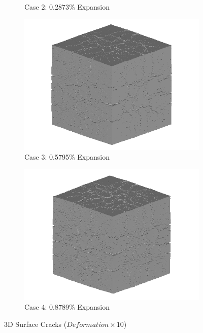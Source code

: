 \begin{figure}[!h]
\begin{subfigure}{.5\textwidth}
    \caption{Case 2: 0.2873\% Expansion}
    \end{subfigure}%
    \begin{subfigure}{.5\textwidth}
      \centering
      \includegraphics[width=.8\linewidth]{Files/exp_3D/DEF/A30X0C_3_3d.png}
    \caption{Case 3: 0.5795\% Expansion}
    \end{subfigure}
    \begin{subfigure}{.5\textwidth}
      \centering
      \includegraphics[width=.8\linewidth]{Files/exp_3D/DEF/A30X0C_4_3d.png}
    \caption{Case 4: 0.8789\% Expansion}
    \end{subfigure}%

  \caption{3D Surface Cracks ($Deformation \times 10$)}
  \label{fig:DEF_A30X0C_3D}
\end{figure}

